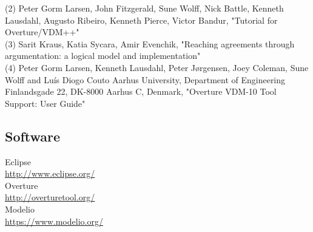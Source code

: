 \documentclass{article}
\begin{document}
\noindent
(2) Peter Gorm Larsen, John Fitzgerald, Sune Wolff, Nick Battle, Kenneth Lausdahl, Augusto Ribeiro, Kenneth Pierce, Victor Bandur, "Tutorial for Overture/VDM++"\\

\noindent
(3) Sarit Kraus, Katia Sycara, Amir Evenchik, "Reaching agreements through argumentation: a logical model and implementation"\\

\noindent
(4) Peter Gorm Larsen, Kenneth Lausdahl, Peter Jørgensen, Joey Coleman, Sune Wolff and Luís Diogo Couto Aarhus University, Department of Engineering Finlandsgade 22, DK-8000 Aarhus C, Denmark, "Overture VDM-10 Tool Support: User Guide"\\
\subsection{Software}

Eclipse \\
\vspace{3mm}\url{http://www.eclipse.org/} \\
Overture \\
\vspace{3mm}\url{http://overturetool.org/} \\
Modelio \\
\vspace{3mm}\url{https://www.modelio.org/} \\
\end{document}
